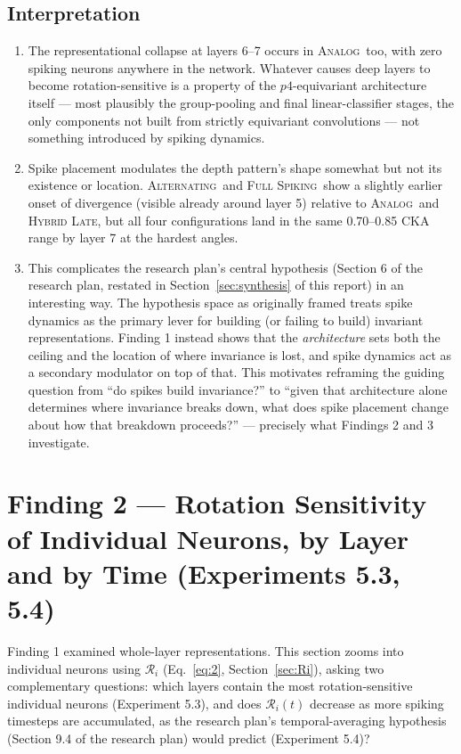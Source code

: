 \documentclass[11pt]{article}
\newcommand{\Analog}{\textsc{Analog}}
\newcommand{\Alternating}{\textsc{Alternating}}
\newcommand{\FullSpiking}{\textsc{Full Spiking}}
\newcommand{\HybridLate}{\textsc{Hybrid Late}}
\begin{document}
\subsection{Interpretation}

\begin{enumerate}[leftmargin=1.8em]
\item The representational collapse at layers 6--7 occurs in \Analog\ too, with zero spiking neurons
anywhere in the network. Whatever causes deep layers to become rotation-sensitive is a property of
the $p4$-equivariant architecture itself --- most plausibly the group-pooling and final
linear-classifier stages, the only components not built from strictly equivariant convolutions ---
not something introduced by spiking dynamics.
\item Spike placement modulates the depth pattern's shape somewhat but not its existence or
location. \Alternating\ and \FullSpiking\ show a slightly earlier onset of divergence (visible
already around layer 5) relative to \Analog\ and \HybridLate, but all four configurations land in
the same 0.70--0.85 CKA range by layer 7 at the hardest angles.
\item This complicates the research plan's central hypothesis (Section 6 of the research plan,
restated in Section~\ref{sec:synthesis} of this report) in an interesting way. The hypothesis space
as originally framed treats spike dynamics as the primary lever for building (or failing to build)
invariant representations. Finding 1 instead shows that the \emph{architecture} sets both the ceiling
and the location of where invariance is lost, and spike dynamics act as a secondary modulator on top
of that. This motivates reframing the guiding question from ``do spikes build invariance?'' to
``given that architecture alone determines where invariance breaks down, what does spike placement
change about how that breakdown proceeds?'' --- precisely what Findings 2 and 3 investigate.
\end{enumerate}

\section{Finding 2 --- Rotation Sensitivity of Individual Neurons, by Layer and by Time (Experiments 5.3, 5.4)}
\label{sec:finding2}

Finding 1 examined whole-layer representations. This section zooms into individual neurons using
$\mathcal{R}_i$ (Eq.~\ref{eq:2}, Section~\ref{sec:Ri}), asking two complementary questions: which
layers contain the most rotation-sensitive individual neurons (Experiment 5.3), and does
$\mathcal{R}_i(t)$ decrease as more spiking timesteps are accumulated, as the research plan's
temporal-averaging hypothesis (Section 9.4 of the research plan) would predict (Experiment 5.4)?
\end{document}

